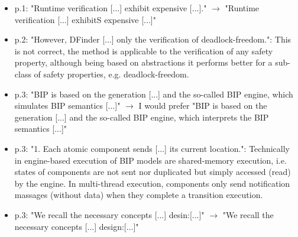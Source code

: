 \begin{itemize}
\item p.1: "Runtime verification [...] exhibit expensive [...]." $\rightarrow$ "Runtime 
verification [...] exhibitS expensive [...]"
\done
\item p.2: "However, DFinder [...] only the verification of deadlock-freedom.": 
This is not correct, the method is applicable to the verification of any 
safety property, although being based on abstractions it performs better for 
a sub-class of safety properties, e.g. deadlock-freedom.


\item p.3: "BIP is based on the generation [...] and the so-called BIP engine, 
which simulates BIP semantics [...]" $\rightarrow$ I would prefer "BIP is based on the 
generation [...] and the so-called BIP engine, which interprets the BIP 
semantics [...]"
\done

\item p.3: "1. Each atomic component sends [...] its current location.": 
Technically in engine-based execution of BIP models are shared-memory 
execution, i.e. states of components are not sent nor duplicated but simply 
accessed (read) by the engine. In multi-thread execution, components only 
send notification massages (without data) when they complete a transition 
execution.



\item p.3: "We recall the necessary concepts [...] desin:[...]" $\rightarrow$ "We recall the 
necessary concepts [...] design:[...]"
\done


\end{itemize}
